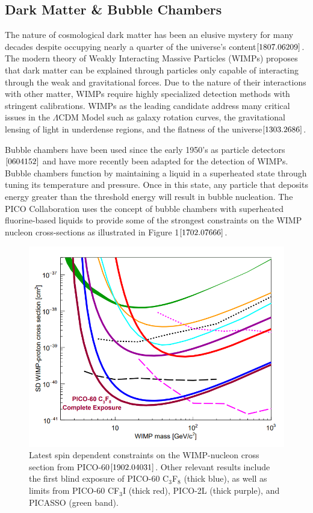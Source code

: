 \documentclass[%
12pt,
twoside,
reprint,
amsmath,amssymb,
aps,
]{article}
\begin{document}
	\subsection{Dark Matter \& Bubble Chambers}
	\par The nature of cosmological dark matter has been an elusive mystery for many decades despite occupying nearly a quarter of the universe's content${\cite{1807.06209}}$. The modern theory of Weakly Interacting Massive Particles (WIMPs) proposes that dark matter can be explained through particles only capable of interacting through the weak and gravitational forces. Due to the nature of their interactions with other matter, WIMPs require highly specialized detection methods with stringent calibrations. WIMPs as the leading candidate address many critical issues in the $\Lambda$CDM Model such as galaxy rotation curves, the gravitational lensing of light in underdense regions, and the flatness of the universe${\cite{1303.2686}}$. 
	\par Bubble chambers have been used since the early 1950's as particle detectors${\cite{0604152}}$ and have more recently been adapted for the detection of WIMPs. Bubble chambers function by maintaining a liquid in a superheated state through tuning its temperature and pressure. Once in this state, any particle that deposits energy greater than the threshold energy will result in bubble nucleation. The PICO Collaboration uses the concept of bubble chambers with superheated fluorine-based liquids to provide some of the strongest constraints on the WIMP nucleon cross-sections as illustrated in Figure 1${\cite{1702.07666}}$.
	
	\begin{figure}
		\includegraphics[scale = 0.4, center]{Images/constraints.png}
		\caption{\label{tab:table-name} Latest spin dependent constraints on the WIMP-nucleon cross section from PICO-60${\cite{1902.04031}}$. Other relevant results include the first blind exposure of PICO-60 C$_{3}$F$_{8}$ (thick blue), as well as limits from PICO-60 CF$_{3}$I (thick red), PICO-2L (thick purple), and PICASSO (green band).}
	\end{figure}
	
\end{document}
